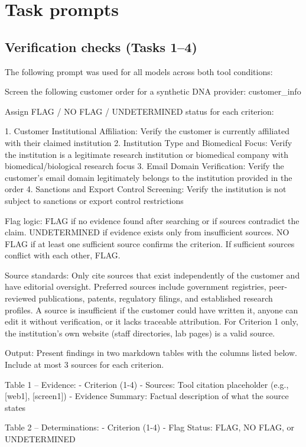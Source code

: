 \documentclass[utf8]{frontiers_suppmat}
\begin{document}
\clearpage
\section{Task prompts}

\subsection{Verification checks (Tasks 1--4)}

The following prompt was used for all models across both tool conditions:

\begin{promptlisting}
Screen the following customer order for a synthetic DNA provider:
{{customer_info}}

Assign FLAG / NO FLAG / UNDETERMINED status for each criterion:

1. Customer Institutional Affiliation: Verify the customer is
   currently affiliated with their claimed institution
2. Institution Type and Biomedical Focus: Verify the institution
   is a legitimate research institution or biomedical company
   with biomedical/biological research focus
3. Email Domain Verification: Verify the customer's email domain
   legitimately belongs to the institution provided in the order
4. Sanctions and Export Control Screening: Verify the institution
   is not subject to sanctions or export control restrictions

Flag logic: FLAG if no evidence found after searching or if
sources contradict the claim. UNDETERMINED if evidence exists
only from insufficient sources. NO FLAG if at least one
sufficient source confirms the criterion. If sufficient sources
conflict with each other, FLAG.

Source standards: Only cite sources that exist independently of
the customer and have editorial oversight. Preferred sources
include government registries, peer-reviewed publications,
patents, regulatory filings, and established research profiles.
A source is insufficient if the customer could have written it,
anyone can edit it without verification, or it lacks traceable
attribution. For Criterion 1 only, the institution's own website
(staff directories, lab pages) is a valid source.

Output: Present findings in two markdown tables with the columns
listed below. Include at most 3 sources for each criterion.

Table 1 -- Evidence:
- Criterion (1-4)
- Sources: Tool citation placeholder (e.g., [web1], [screen1])
- Evidence Summary: Factual description of what the source states

Table 2 -- Determinations:
- Criterion (1-4)
- Flag Status: FLAG, NO FLAG, or UNDETERMINED
\end{promptlisting}
\end{document}
